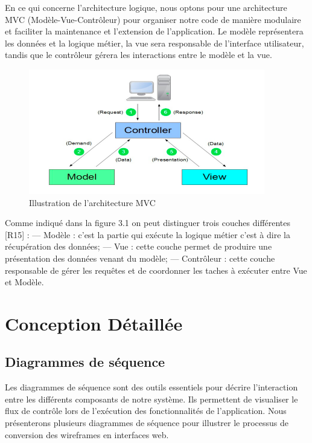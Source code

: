 En ce qui concerne l'architecture logique, nous optons pour une architecture MVC (Modèle-Vue-Contrôleur) pour organiser notre code de manière modulaire et faciliter la maintenance et l'extension de l'application. Le modèle représentera les données et la logique métier, la vue sera responsable de l'interface utilisateur, tandis que le contrôleur gérera les interactions entre le modèle et la vue.
\begin{figure}[h]
    \centering
    \includegraphics[width=\textwidth]{images/mvc.png}
    \caption{Illustration de l'architecture MVC}
    \label{fig:mvc_architecture}
\end{figure}
\vspace{3cm}
\newline Comme indiqué dans la figure 3.1 on peut distinguer trois couches différentes [R15] :
\newline— Modèle : c’est la partie qui exécute la logique métier c’est à dire la récupération
des données;
\newline— Vue : cette couche permet de produire une présentation des données venant du
modèle;
\newline— Contrôleur : cette couche responsable de gérer les requêtes et de coordonner les
taches à exécuter entre Vue et Modèle.

\section{Conception Détaillée}

\subsection{Diagrammes de séquence}

Les diagrammes de séquence sont des outils essentiels pour décrire l'interaction entre les différents composants de notre système. Ils permettent de visualiser le flux de contrôle lors de l'exécution des fonctionnalités de l'application. Nous présenterons plusieurs diagrammes de séquence pour illustrer le processus de conversion des wireframes en interfaces web.


